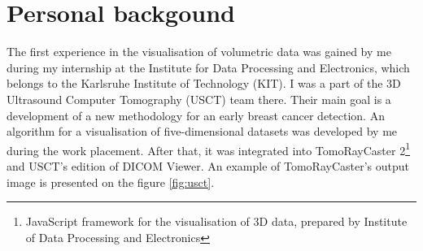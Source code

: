 \documentclass[twoside, english, 11pt]{report}
\begin{document}
\section{Personal backgound}

The first experience in the visualisation of volumetric data was gained by me during my internship at the Institute for Data Processing and Electronics, which belongs to the Karlsruhe Institute of Technology (KIT). I was a part of the 3D Ultrasound Computer Tomography (USCT) team there. Their main goal is a development of a new methodology for an early breast cancer detection. An algorithm for a visualisation of five-dimensional datasets was developed by me during the work placement. After that, it was integrated into TomoRayCaster 2\footnote{JavaScript framework for the visualisation of 3D data, prepared by Institute of Data Processing and Electronics} and USCT's edition of DICOM Viewer. An example of TomoRayCaster's output image is presented on the figure \ref{fig:usct}.\\
\end{document}
